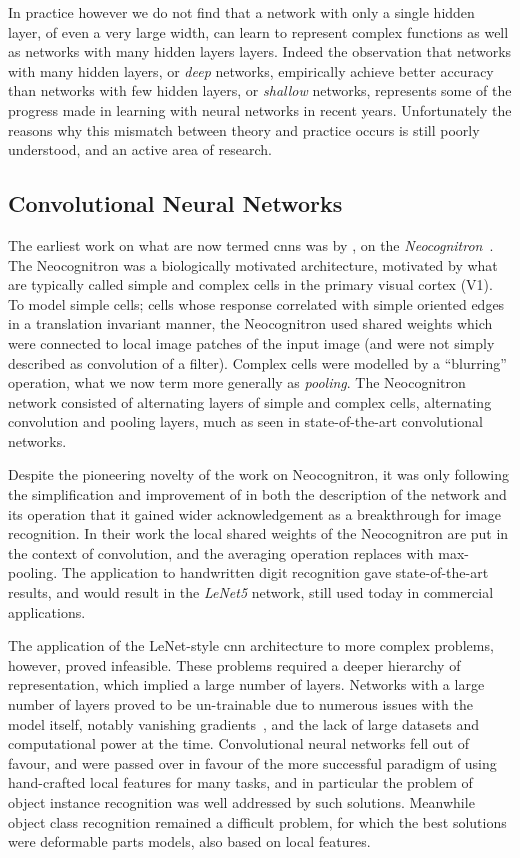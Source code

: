 \documentclass[thesis]{subfiles}
\begin{document}
In practice however we do not find that a network with only a single hidden layer, of even a very large width, can learn to represent complex functions as well as networks with many hidden layers layers. Indeed the observation that networks with many hidden layers, or \emph{deep} networks, empirically achieve better accuracy than networks with few hidden layers, or \emph{shallow} networks, represents some of the progress made in learning with neural networks in recent years. Unfortunately the reasons why this mismatch between theory and practice occurs is still poorly understood, and an active area of research.

\subsection{Convolutional Neural Networks}\label{cnns}
The earliest work on what are now termed \glspl{cnn} was by \citet{Fuk80}, on the \emph{Neocognitron}~\citep{fukushima2013artificial}. The Neocognitron was a biologically motivated architecture, motivated by what are typically called simple and complex cells in the primary visual cortex (V1). To model simple cells; cells whose response correlated with simple oriented edges in a translation invariant manner, the Neocognitron used shared weights which were connected to local image patches of the input image (and were not simply described as convolution of a filter). Complex cells were modelled by a ``blurring'' operation, what we now term more generally as \emph{pooling}. The Neocognitron network consisted of alternating layers of simple and complex cells, \ie{}alternating convolution and pooling layers, much as seen in state-of-the-art convolutional networks.

Despite the pioneering novelty of the work on Neocognitron, it was only following the simplification and improvement of \citet{Lecun1998} in both the description of the network and its operation that it gained wider acknowledgement as a breakthrough for image recognition. In their work the local shared weights of the Neocognitron are put in the context of convolution, and the averaging operation replaces with max-pooling. The application to handwritten digit recognition gave state-of-the-art results, and would result in the \emph{LeNet5} network, still used today in commercial applications.

The application of the LeNet-style \gls{cnn} architecture to more complex problems, however, proved infeasible. These problems required a deeper hierarchy of representation, which implied a large number of layers. Networks with a large number of layers proved to be un-trainable due to numerous issues with the model itself, notably vanishing gradients~\citep{hochreiter1991untersuchungen}, and the lack of large datasets and computational power at the time. Convolutional neural networks fell out of favour, and were passed over in favour of the more successful paradigm of using hand-crafted local features for many tasks, and in particular the problem of object instance recognition was well addressed by such solutions. Meanwhile object class recognition remained a difficult problem, for which the best solutions were deformable parts models, also based on local features.
\end{document}
